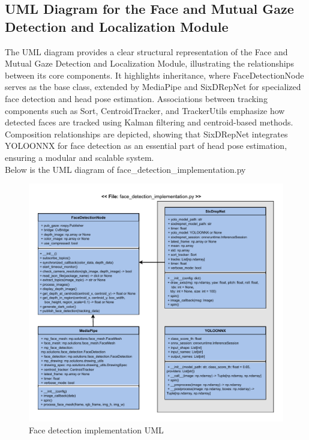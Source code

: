 \documentclass{CSSRforAfrica}
\begin{document}
{\subsection*{UML Diagram for the Face and Mutual Gaze Detection and Localization Module}
The UML diagram provides a clear structural representation of the Face and Mutual Gaze Detection and Localization Module, illustrating the relationships between its core components. It highlights inheritance, where FaceDetectionNode serves as the base class, extended by MediaPipe and SixDRepNet for specialized face detection and head pose estimation. Associations between tracking components such as Sort, CentroidTracker, and TrackerUtils emphasize how detected faces are tracked using Kalman filtering and centroid-based methods. Composition relationships are depicted, showing that SixDRepNet integrates YOLOONNX for face detection as an essential part of head pose estimation, ensuring a modular and scalable system.\\

Below is the UML diagram of face\_detection\_implementation.py

\begin{figure}[!hbpt]
	\centering
	\hspace*{-0.5cm} %
	\includegraphics[scale=0.85]{images/Face_implementation_UML.pdf}
	\caption{Face detection implementation UML}
	\label{fig: Face_implementation_UML}
\end{figure}

}
\end{document}
